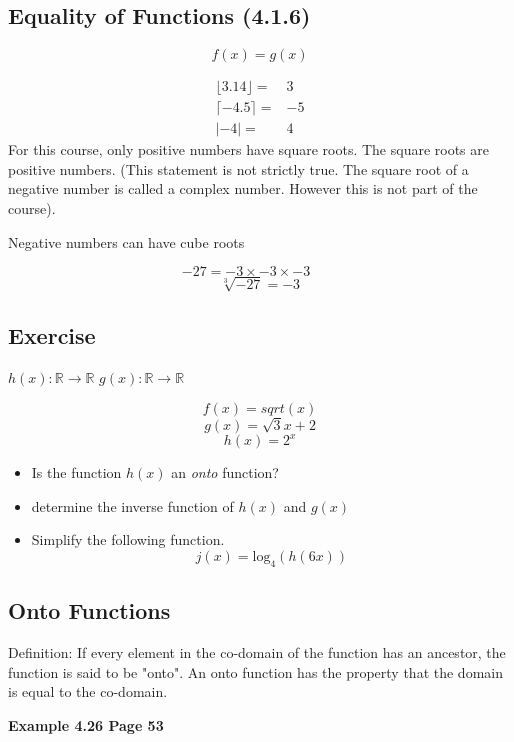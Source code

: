 \documentclass[12pt]{article}
\begin{document}
\subsection*{Equality of Functions (4.1.6)}
\[f(x) = g(x) \]


{
\large
\begin{eqnarray}
\lfloor 3.14 \rfloor =& 3 \\
\lceil -4.5 \rceil =& -5 \\
| -4 | =&  4
\end{eqnarray}
}
For this course, only positive numbers have square roots. The square roots are positive numbers. (This statement is not strictly true. The square root of a negative number is called a complex number. However this is not part of the course).

Negative numbers can have cube roots

{
\[ -27 = -3 \times -3 \times -3 \qquad \]
\LARGE
\[ \sqrt[3]{-27} = -3 \]
}



\subsection{Exercise} 
$h(x): \mathbb{R} \rightarrow \mathbb{R}$ 
$g(x): \mathbb{R} \rightarrow \mathbb{R}$

\[f(x) = sqrt(x)\]
\[g(x) = \sqrt{3}{x+2}\]
\[h(x) = 2^x\]

\begin{itemize}
\item Is the function $h(x)$ an \textit{onto} function?
\item determine the inverse function of $h(x)$ and $g(x)$
\item Simplify the following function.
\[ j(x) = \mbox{log}_4(h(6x))\]
\end{itemize}
\subsection{Onto Functions}
Definition: If every element in the co-domain of the function has an ancestor, the function is said to be "onto".
An onto function has the property that the domain is equal to the co-domain.


\textbf{Example 4.26 Page 53}
\end{document}
